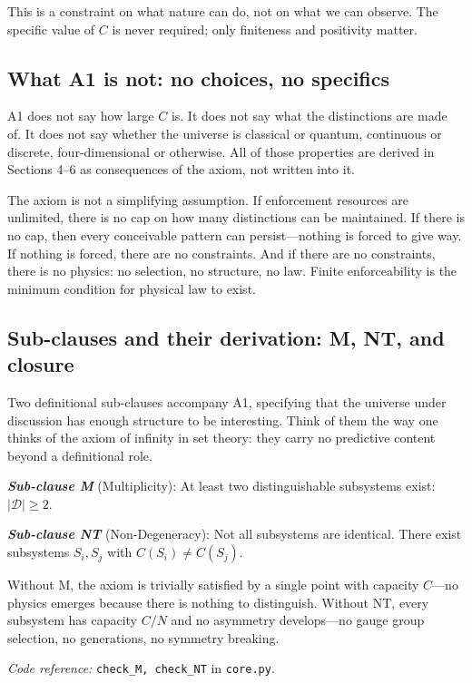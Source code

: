 \documentclass[11pt]{article}
\newcommand{\coderef}[2]{\smallskip\noindent\textit{Code reference:} \texttt{#1} in \texttt{#2}.}
\begin{document}
This is a constraint on what nature can do, not on what we can observe.  The specific value of $C$ is never required; only finiteness and positivity matter.

\subsection{What A1 is not: no choices, no specifics}

A1 does not say how large $C$ is.  It does not say what the distinctions are made of.  It does not say whether the universe is classical or quantum, continuous or discrete, four-dimensional or otherwise.  All of those properties are derived in Sections 4--6 as consequences of the axiom, not written into it.

The axiom is not a simplifying assumption.  If enforcement resources are unlimited, there is no cap on how many distinctions can be maintained.  If there is no cap, then every conceivable pattern can persist---nothing is forced to give way.  If nothing is forced, there are no constraints.  And if there are no constraints, there is no physics: no selection, no structure, no law.  Finite enforceability is the minimum condition for physical law to exist.

\subsection{Sub-clauses and their derivation: M, NT, and closure}

Two definitional sub-clauses accompany A1, specifying that the universe under discussion has enough structure to be interesting.  Think of them the way one thinks of the axiom of infinity in set theory: they carry no predictive content beyond a definitional role.

\begin{tcolorbox}[apfbox, title={Sub-Clauses M (Multiplicity) and NT (Non-Degeneracy)}]
\textbf{\textit{Sub-clause M}} (Multiplicity): At least two distinguishable subsystems exist: $|\mathcal{D}| \ge 2$.

\smallskip
\textbf{\textit{Sub-clause NT}} (Non-Degeneracy): Not all subsystems are identical.  There exist subsystems $S_i, S_j$ with $C(S_i) \ne C(S_j)$.

\smallskip
Without M, the axiom is trivially satisfied by a single point with capacity $C$---no physics emerges because there is nothing to distinguish.  Without NT, every subsystem has capacity $C/N$ and no asymmetry develops---no gauge group selection, no generations, no symmetry breaking.

\coderef{check\_M, check\_NT}{core.py}
\end{tcolorbox}
\end{document}
